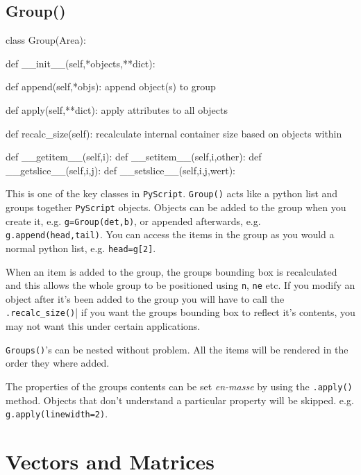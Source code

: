 \documentclass[a4paper]{book}
\begin{document}
\subsection{Group()}
\label{sec:group}
\begin{python}
class Group(Area):

    def __init__(self,*objects,**dict):

    def append(self,*objs):
        append object(s) to group

    def apply(self,**dict):
        apply attributes to all objects

    def recalc_size(self):
        recalculate internal container size based on objects within

    def __getitem__(self,i):
    def __setitem__(self,i,other):
    def __getslice__(self,i,j):
    def __setslice__(self,i,j,wert):
\end{python}

This is one of the key classes in \Verb|PyScript|. \Verb|Group()| acts
like a python list and groups together  \Verb|PyScript| objects. Objects
can be added to the group when you create it, e.g. \Verb|g=Group(det,b)|,
or appended afterwards, e.g. \Verb|g.append(head,tail)|. You can access the 
items in the group as you would a normal python list, e.g. \Verb|head=g[2]|.

When an item is added to the group, the groups bounding box is recalculated
and this allows the whole group to be positioned using \Verb|n|, \Verb|ne|
etc. If you modify an object after it's been added to the group you will
have to call the \Verb|.recalc_size()|| if you want the groups bounding box
to reflect it's contents, you may not want this under certain applications. 

\Verb|Groups()|'s can be nested without problem. All the items will be
rendered in the order they where added. 

The properties of the groups contents can be set \emph{en-masse} by
using the \Verb|.apply()| method. Objects that don't understand a
particular property will be skipped. e.g. \Verb|g.apply(linewidth=2)|.



\section{Vectors and Matrices}

\end{document}
